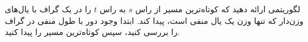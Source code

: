 لگوریتمی ارائه دهید که کوتاه‌ترین مسیر از راس $s$ به راس $t$ را در یک گراف با یال‌های وزن‌دار که تنها وزن یک یال منفی است، پیدا کند. ابتدا وجود دور با طول منفی در گراف را بررسی کنید، سپس کوتاه‌ترین مسیر را پیدا کنید.